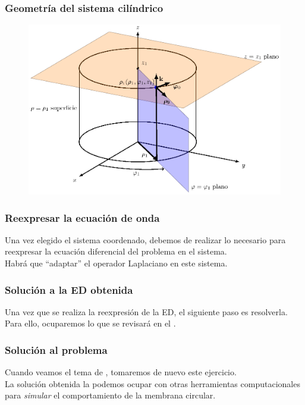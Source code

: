 \documentclass[12pt]{beamer}
\begin{document}
\begin{frame}
\frametitle{Geometría del sistema cilíndrico}
\begin{figure}[H]
  \centering
  \includegraphics[scale=0.7]{Imagenes/Coordenadas_Cilindricas_01.eps}
\end{figure}
\end{frame}
\begin{frame}
\frametitle{Reexpresar la ecuación de onda}
Una vez elegido el sistema coordenado, debemos de realizar lo necesario para reexpresar la ecuación diferencial del problema en el sistema.
\\
\bigskip
\pause
Habrá que \enquote{adaptar} el operador Laplaciano en este sistema.
\end{frame}
\begin{frame}
\frametitle{Solución a la ED obtenida}
Una vez que se realiza la reexpresión de la ED, el siguiente paso es resolverla.
\\
\bigskip
\pause
Para ello, ocuparemos lo que se revisará en el \emph{}.
\end{frame}
\begin{frame}
\frametitle{Solución al problema}
Cuando veamos el tema de , tomaremos de nuevo este ejercicio.
\\
\bigskip
\pause
La solución obtenida la podemos ocupar con otras herramientas computacionales para \emph{simular} el comportamiento de la membrana circular.
\end{frame}
\end{document}
